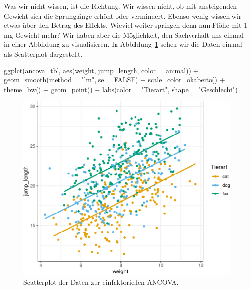 \documentclass[
  letterpaper,
]{scrbook}
\newenvironment{Shaded}{\begin{snugshade}}{\end{snugshade}}
\newcommand{\AttributeTok}[1]{\textcolor[rgb]{0.40,0.45,0.13}{#1}}
\newcommand{\ConstantTok}[1]{\textcolor[rgb]{0.56,0.35,0.01}{#1}}
\newcommand{\FunctionTok}[1]{\textcolor[rgb]{0.28,0.35,0.67}{#1}}
\newcommand{\NormalTok}[1]{\textcolor[rgb]{0.00,0.23,0.31}{#1}}
\newcommand{\SpecialCharTok}[1]{\textcolor[rgb]{0.37,0.37,0.37}{#1}}
\newcommand{\StringTok}[1]{\textcolor[rgb]{0.13,0.47,0.30}{#1}}
\begin{document}
Was wir nicht wissen, ist die Richtung. Wir wissen nicht, ob mit
ansteigenden Gewicht sich die Sprunglänge erhöht oder vermindert. Ebenso
wenig wissen wir etwas über den Betrag des Effekts. Wieviel weiter
springen denn nun Flöhe mit 1 mg Gewicht mehr? Wir haben aber die
Möglichkeit, den Sachverhalt uns einmal in einer Abbildung zu
visualisieren. In Abbildung~\ref{fig-stat-ancova-01} sehen wir die Daten
einmal als Scatterplot dargestellt.

\begin{Shaded}
\begin{Highlighting}[]
\FunctionTok{ggplot}\NormalTok{(ancova\_tbl, }\FunctionTok{aes}\NormalTok{(weight, jump\_length, }\AttributeTok{color =}\NormalTok{ animal)) }\SpecialCharTok{+}
  \FunctionTok{geom\_smooth}\NormalTok{(}\AttributeTok{method =} \StringTok{"lm"}\NormalTok{, }\AttributeTok{se =} \ConstantTok{FALSE}\NormalTok{) }\SpecialCharTok{+}
  \FunctionTok{scale\_color\_okabeito}\NormalTok{() }\SpecialCharTok{+}
  \FunctionTok{theme\_bw}\NormalTok{() }\SpecialCharTok{+}
  \FunctionTok{geom\_point}\NormalTok{() }\SpecialCharTok{+}
  \FunctionTok{labs}\NormalTok{(}\AttributeTok{color  =} \StringTok{"Tierart"}\NormalTok{, }\AttributeTok{shape =} \StringTok{"Geschlecht"}\NormalTok{)  }
\end{Highlighting}
\end{Shaded}

\begin{figure}[H]

{\centering \includegraphics{./stat-tests-ancova_files/figure-pdf/fig-stat-ancova-01-1.pdf}

}

\caption{\label{fig-stat-ancova-01}Scatterplot der Daten zur
einfaktoriellen ANCOVA.}

\end{figure}
\end{document}
